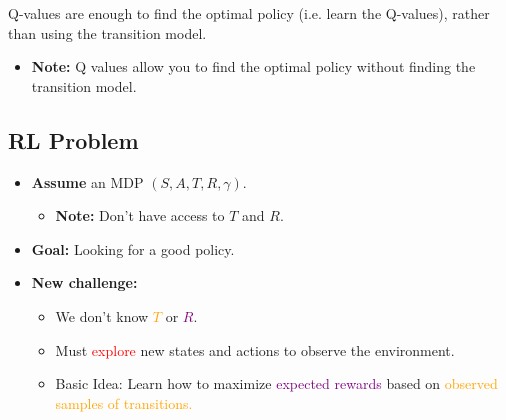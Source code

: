 \begin{warning}
    Q-values are enough to find the optimal policy (i.e. learn the Q-values), rather than using the transition model. 
    \begin{itemize}
        \item \textbf{Note:} Q values allow you to find the optimal policy without finding the transition model.
    \end{itemize}
\end{warning}

\subsection{RL Problem}
\begin{definition}
    \begin{itemize}
        \item \textbf{Assume} an MDP $(S, A, T, R, \gamma)$.
        \begin{itemize}
            \item \textbf{Note:} Don't have access to $T$ and $R$.
        \end{itemize}
        \item \textbf{Goal:} Looking for a good policy.
        \item \textbf{New challenge:}
        \begin{itemize}
            \item We don't know \textcolor{orange}{$T$} or \textcolor{purple}{$R$}.
            \item Must \textcolor{red}{explore} new states and actions to observe the environment.
            \item Basic Idea: Learn how to maximize \textcolor{purple}{expected rewards} based on \textcolor{orange}{observed samples of transitions.}
        \end{itemize}
    \end{itemize}
\end{definition}

